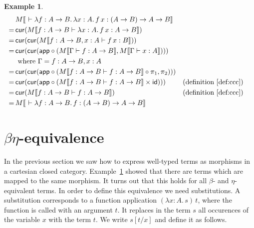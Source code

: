 \documentclass{article}
\newtheorem{exmpl}[defn]{Example}
\newcommand{\type}{\vdash}
\begin{document}

\begin{exmpl}
    \label{exp:sem}
    \begin{align*}
            & M |[ \ \type \lambda f: A \to B.\, \lambda x: A.\, f\,x: (A \to B) \to A \to B |] \\
        = \,& \mathsf{cur}(M |[ f: A \to B \type \lambda x: A. \, f\,x : A \to B |]) \\
        = \,& \mathsf{cur}(\mathsf{cur}( M |[ f: A \to B, x: A \type f \, x : B |])) \\
        = \,& \mathsf{cur}(\mathsf{cur}(\mathsf{app} \circ (M |[\Gamma \type f: A \to B |], M |[\Gamma \type x : A|]))) \\
            &  \text{ where } \Gamma = f: A \to B, x: A \\
        = \,& \mathsf{cur}(\mathsf{cur}(\mathsf{app} \circ (M |[ f: A \to B \type f : A \to B |] \circ \pi_1, \pi_2))) \\
        = \,& \mathsf{cur}(\mathsf{cur}(\mathsf{app} \circ (M |[ f: A \to B \type f : A \to B |] \times \mathsf{id}))) && (\text{definition}~\ref{def:ccc}) \\
        = \,& \mathsf{cur}(M |[ f: A \to B \type f : A \to B |]) && (\text{definition}~\ref{def:ccc})\\
        = \,& M |[ \ \type \lambda f: A \to B.\, f: (A \to B) \to A \to B |]
    \end{align*}
\end{exmpl}


\section[beta-eta-equivalence]{$\beta\eta$-equivalence}

In the previous section we saw how to express well-typed terms as morphisms in a cartesian closed category.
Example~\ref{exp:sem} showed that there are terms which are mapped to the same morphism.
It turns out that this holds for all $\beta$- and $\eta$-equivalent terms.
In order to define this equivalence we need substitutions.
A substitution corresponds to a function application $(\lambda x: A.\, s)\, t$, where the function is called with an argument $t$.
It replaces in the term $s$ all occurences of the variable $x$ with the term $t$.
We write $s[t/x]$ and define it as follows.
\end{document}
